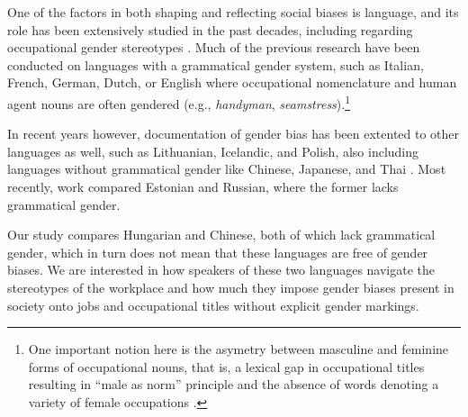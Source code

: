 \documentclass[11pt]{article}
\begin{document}
One of the factors in both shaping and reflecting social biases is language, and its role has been extensively studied in the past decades, including regarding occupational gender stereotypes \citep[cf.][]{sabatini_1985_occupational,pauwels_1997_handymen,gygax_2008_generically,misersky_2014_norms,lewis_2020_gender,kaukonen_2025_gender}. Much of the previous research have been conducted on languages with a grammatical gender system, such as Italian, French, German, Dutch, or English where occupational nomenclature and human agent nouns are often gendered (e.g., \textit{handyman}, \textit{seamstress}).\footnote{One important notion here is the asymetry between masculine and feminine forms of occupational nouns, that is, a lexical gap in occupational titles resulting in ``male as norm'' principle and the absence of words denoting a variety of female occupations \citep{baron_1986_grammar,hellinger_1990_kontrastive,sabatini_1985_occupational,yaguello_1978_mots,pauwels_2003_linguistic,lassonde_2013_occupational}.} 



In recent years however, documentation of gender bias has been extented to other languages as well, such as Lithuanian, Icelandic, and Polish, also including languages without grammatical gender like Chinese, Japanese, and Thai \citep[][]{hellinger_2003_gender,pauwels_2003_linguistic}. Most recently,  work compared Estonian and Russian, where the former lacks grammatical gender.

Our study compares Hungarian and Chinese, both of which lack grammatical gender, which in turn does not mean that these languages are free of gender biases. We are interested in how speakers of these two languages navigate the stereotypes of the workplace and how much they impose gender biases present in society onto jobs and occupational titles without explicit gender markings.
\end{document}
